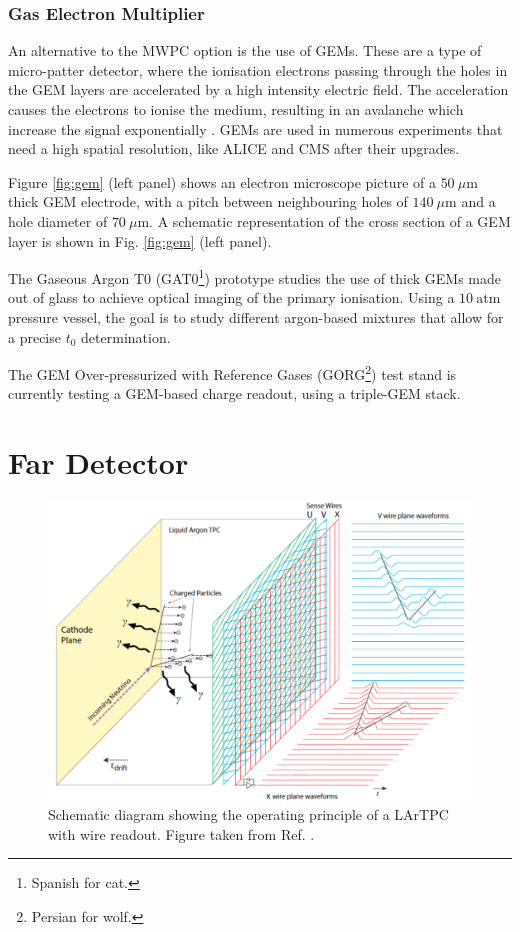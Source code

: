 \subsubsection{Gas Electron Multiplier}

An alternative to the MWPC option is the use of GEMs. These are a type of micro-patter detector, where the ionisation electrons passing through the holes in the GEM layers are accelerated by a high intensity electric field. The acceleration causes the electrons to ionise the medium, resulting in an avalanche which increase the signal exponentially \cite{Sauli1997}. GEMs are used in numerous experiments that need a high spatial resolution, like ALICE \cite{Lippmann2016} and CMS \cite{Calabria2016} after their upgrades.

Figure \ref{fig:gem} (left panel) shows an electron microscope picture of a $50~\mu\mathrm{m}$ thick GEM electrode, with a pitch between neighbouring holes of $140~\mu\mathrm{m}$ and a hole diameter of $70~\mu\mathrm{m}$. A schematic representation of the cross section of a GEM layer is shown in Fig. \ref{fig:gem} (left panel).

The Gaseous Argon T0 (GAT0\footnote{Spanish for cat.}) prototype studies the use of thick GEMs made out of glass to achieve optical imaging of the primary ionisation. Using a $10~\mathrm{atm}$ pressure vessel, the goal is to study different argon-based mixtures that allow for a precise $t_{0}$ determination.

The GEM Over-pressurized with Reference Gases (GORG\footnote{Persian for wolf.}) test stand is currently testing a GEM-based charge readout, using a triple-GEM stack.

\section{Far Detector}

\begin{figure}[t]
	\centering
	\includegraphics[width=0.8\linewidth]{Images/DUNE/FD/tpc}
	\caption[Schematic diagram showing the operating principle of a LArTPC with wire readout.]{Schematic diagram showing the operating principle of a LArTPC with wire readout. Figure taken from Ref. \cite{DUNE2020TDR1}.}
	\label{fig:lartpc}
\end{figure}


